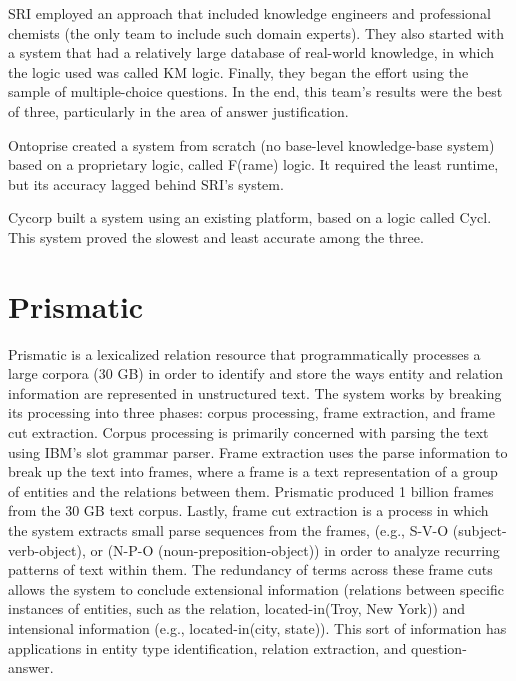 SRI employed an approach that included knowledge engineers and 
professional chemists (the only team to include such domain experts).
They also started with a system that had a relatively large database
of real-world knowledge, in which the logic used was called KM logic.
Finally, they began the effort using the sample of multiple-choice questions.  In the end, this team's results were the best of three, particularly in the area of answer justification.

Ontoprise created a system from scratch (no base-level knowledge-base system) based on a proprietary logic, called F(rame) logic.  It required the least runtime, but its accuracy lagged behind SRI's system.

Cycorp built a system using an existing platform, based on a logic called Cycl.  This system proved the slowest and least accurate among the three.

\section{Prismatic}

Prismatic \cite{fan2012automatic} is a lexicalized relation resource that programmatically processes a large corpora (30 GB) in order to identify and store the ways entity and relation information are represented in unstructured text.  The system works by breaking its processing into
three phases:  corpus processing, frame extraction, and frame cut extraction.  Corpus processing is primarily concerned with parsing the text using IBM's slot grammar parser.  Frame extraction uses the parse information to break up the text into frames, where a frame is a text representation of a group of entities and the relations between them.  Prismatic produced 1 billion frames from the 30 GB text corpus.  Lastly, frame cut extraction is a process in which the system extracts small parse sequences from the frames, (e.g., S-V-O (subject-verb-object), or
(N-P-O (noun-preposition-object)) in order to analyze recurring patterns of text within them.  The redundancy of terms across these frame cuts allows the system to conclude extensional information (relations between specific instances of entities, such as the relation, located-in(Troy, New York)) and intensional information (e.g., located-in(city, state)).  This sort of information has applications in entity type identification, relation extraction, and question-answer.

